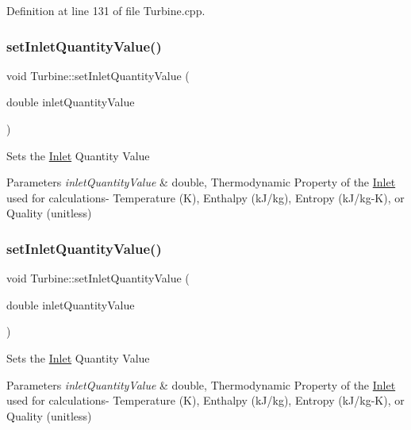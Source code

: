 Definition at line 131 of file Turbine.\+cpp.

\mbox{\label{class_turbine_ac01a053462c83e21ecc2158e75477542}} 
\subsubsection{\texorpdfstring{set\+Inlet\+Quantity\+Value()}{setInletQuantityValue()}\hspace{0.1cm}{\footnotesize\ttfamily [2/3]}}
{\footnotesize\ttfamily void Turbine\+::set\+Inlet\+Quantity\+Value (\begin{DoxyParamCaption}\item[{double}]{inlet\+Quantity\+Value }\end{DoxyParamCaption})}

Sets the \hyperlink{class_inlet}{Inlet} Quantity Value


\begin{DoxyParams}{Parameters}
{\em inlet\+Quantity\+Value} & double, Thermodynamic Property of the \hyperlink{class_inlet}{Inlet} used for calculations-\/ Temperature (K), Enthalpy (k\+J/kg), Entropy (k\+J/kg-\/K), or Quality (unitless) \\
\hline
\end{DoxyParams}
\mbox{\label{class_turbine_ac01a053462c83e21ecc2158e75477542}} 
\subsubsection{\texorpdfstring{set\+Inlet\+Quantity\+Value()}{setInletQuantityValue()}\hspace{0.1cm}{\footnotesize\ttfamily [3/3]}}
{\footnotesize\ttfamily void Turbine\+::set\+Inlet\+Quantity\+Value (\begin{DoxyParamCaption}\item[{double}]{inlet\+Quantity\+Value }\end{DoxyParamCaption})}

Sets the \hyperlink{class_inlet}{Inlet} Quantity Value


\begin{DoxyParams}{Parameters}
{\em inlet\+Quantity\+Value} & double, Thermodynamic Property of the \hyperlink{class_inlet}{Inlet} used for calculations-\/ Temperature (K), Enthalpy (k\+J/kg), Entropy (k\+J/kg-\/K), or Quality (unitless) \\
\hline
\end{DoxyParams}
\mbox{\label{class_turbine_ae67daa481ef48bcf8aef84bcccb4611d}} 

